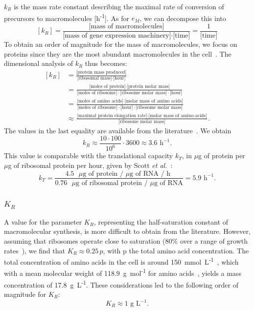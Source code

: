 $k_R$ is the mass rate constant describing the maximal rate of conversion of precursors to macromolecules [h\textsuperscript{-1}].
As for $e_M$, we can decompose this into
\[
[k_R]  = \frac{\text{[mass of macromolecules]}}{\text{[mass of gene expression machinery]}\cdot \text{[time]}} = \frac{1}{\text{[time]}}
\]
To obtain an order of magnitude for the mass of macromolecules, we focus on proteins since they are the most abundant macromolecules in the cell~\cite{ehrenberg_mediumdependent_2012}.
The dimensional analysis of $k_R$ thus becomes:
\[
\begin{aligned}
\left[k_R\right] &= \frac{\text{[protein mass produced]}}{\text{[ribosomal mass]} \cdot \text{[hour]}}\\
&= \frac{\text{[moles of protein]} \cdot \text{[protein molar mass]}}{\text{[moles of ribosome]} \cdot \text{[ribosome molar mass]} \cdot \text{[hour]}}\\
&= \frac{\text{[moles of amino acids]} \cdot \text{[molar mass of amino acids]}}{\text{[moles of ribosome]} \cdot \text{[hour]} \cdot \text{[ribosome molar mass]}}\\
&\approx \frac{\text{[maximal protein elongation rate]} \cdot \text{[molar mass of amino-acids]}}{\text{[ribosome molar mass]}}.
\end{aligned}
\]
The values in the last equality are available from the literature~\cite{ehrenberg_mediumdependent_2012,klumpp_molecular_2013,hachiya_increase_2007,yamamoto_mass_2006}.
We obtain
\[
k_R \approx \frac{10 \cdot 100}{10^6}\cdot 3600 \approx 3.6 \text{ h}^{-1}.
\]
This value is comparable with the translational capacity $k_T$, in $\mu$g of protein per $\mu$g of ribosomal protein per hour, given by Scott \textit{et al.}~\cite{scott_interdependence_2010}:
\[
k_T = \frac{4.5 \text{ }\mu\text{g of protein} \text{ / }\mu\text{g of RNA} \text{ / h }}{0.76 \text{ }\mu\text{g of ribosomal protein} \text{ / } \mu\text{g of RNA}} = 5.9 \text{ h}^{-1}.
\]

\subsubsection{\Large \texorpdfstring{$K_R$}{KR}}

A value for the parameter $K_R$, representing the half-saturation constant of macromolecular synthesis, is more difficult to obtain from the literature.
However, assuming that ribosomes operate close to saturation (80\% over a range of growth rates~\cite{ehrenberg_mediumdependent_2012}), we find that $K_R \approx 0.25\,p$, with p the total amino acid concentration.
The total concentration of amino acids in the cell is around 150~mmol~L\textsuperscript{-1}~\cite{bennett_absolute_2009}, which with a mean molecular weight of 118.9~g~mol\textsuperscript{-1} for amino acids~\cite{hachiya_increase_2007}, yields a mass concentration of 17.8~g~L\textsuperscript{-1}.
These considerations led to the following order of magnitude for $K_R$:
\[
K_R \approx 1\text{ g L}^{-1}.
\]

